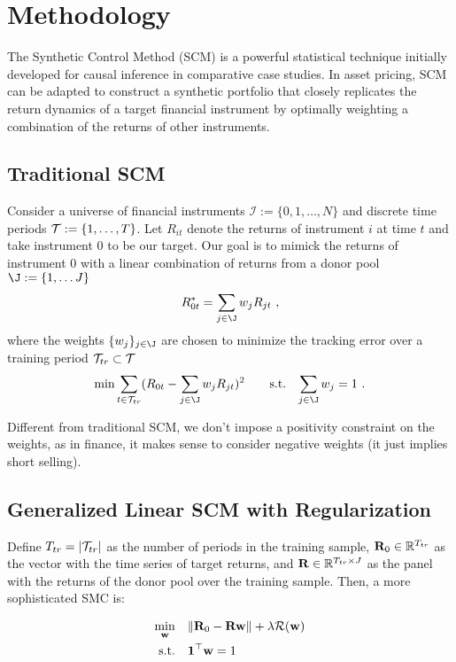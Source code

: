 \section{Methodology}

\hspace{0.5cm} The Synthetic Control Method (SCM) is a powerful statistical technique initially developed for causal inference in comparative case studies. In asset pricing, SCM can be adapted to construct a synthetic portfolio that closely replicates the return dynamics of a target financial instrument by optimally weighting a combination of the returns of other instruments. 

\subsection{Traditional SCM}

Consider a universe of financial instruments $\mathcal I:= \{0,1,\ldots,N\}$ and discrete time periods $\mathcal{T} := \{1,\ldots,T\}$. Let $R_{it}$ denote the returns of instrument $i$ at time $t$ and take instrument 0 to be our target. Our goal is to mimick the returns of instrument 0 with a linear combination of returns from a donor pool $\J:=\{1,\ldots J\}$
$$
R_{0t}^* = \sum_{j\in\J} w_{j} R_{jt} ~,
$$
where the weights $\{w_{j}\}_{j\in\J}$ are chosen to minimize the tracking error over a training period $\mathcal{T}_{tr}\subset \mathcal{T}$
$$
\begin{aligned}
\min & \sum_{t\in\mathcal T_{tr}} (R_{0t} - \sum_{j\in\J} w_{j} R_{jt})^2
\qquad 
\t{s.t.} & \sum_{j\in\J} w_j = 1
~.
\end{aligned}
$$

Different from traditional SCM, we don't impose a positivity constraint on the weights, as in finance, it makes sense to consider negative weights (it just implies short selling).


\subsection{Generalized Linear SCM with Regularization}
Define $T_{tr}=\left|\mathcal{T}_{tr}\right|$ as the number of periods in the training sample, $\mathbf R_0\in\mathbb{R}^{T_{tr}}$ as the vector with the time series of target returns, and $\mathbf R\in\mathbb{R}^{T_{tr}\times J}$ as the panel with the returns of the donor pool over the training sample. Then, a more sophisticated SMC is:

$$\begin{aligned}
\min_{\mathbf{w}} & \quad 
\lVert\mathbf R_0 - \mathbf R \mathbf{w}\rVert 
+ \lambda \mathcal{R}(\mathbf{w}) 
\\
\text{s.t.} & \quad 
\mathbf 1^\top \mathbf w = 1
\end{aligned}$$

